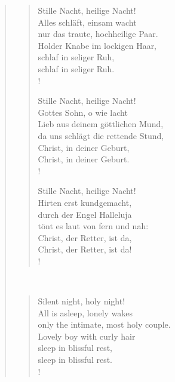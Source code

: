 \documentclass[12pt,paper=a4]{scrartcl}
\begin{document}
\begin{quote}
\begin{minipage}{.5\linewidth}
\begin{verse}
\renewcommand*{\vrightskip}{-2em}
\verselinenumbersleft
{}
\begin{patverse}
Stille Nacht, heilige Nacht!\\
Alles schläft, einsam wacht\\
nur das traute, hochheilige Paar.\\
Holder Knabe im lockigen Haar,\\
schlaf in seliger Ruh,\\
schlaf in seliger Ruh.\\!
\end{patverse}

\begin{patverse}
Stille Nacht, heilige Nacht!\\
Gottes Sohn, o wie lacht\\
Lieb aus deinem göttlichen Mund,\\
da uns schlägt die rettende Stund,\\
Christ, in deiner Geburt,\\
Christ, in deiner Geburt.\\!
\end{patverse}

\begin{patverse}
Stille Nacht, heilige Nacht!\\
Hirten erst kundgemacht,\\
durch der Engel Halleluja\\
tönt es laut von fern und nah:\\
Christ, der Retter, ist da,\\
Christ, der Retter, ist da!\\!
\end{patverse}
\end{verse}
\end{minipage}
~
\begin{minipage}{.5\linewidth}
\itshape
\begin{verse}
\begin{patverse}
Silent night, holy night!\\
All is asleep, lonely wakes\\
only the intimate, most holy couple.\\
Lovely boy with curly hair\\
sleep in blissful rest,\\
sleep in blissful rest.\\!
\end{patverse}


\end{verse}
\end{minipage}
\end{quote}
\end{document}
